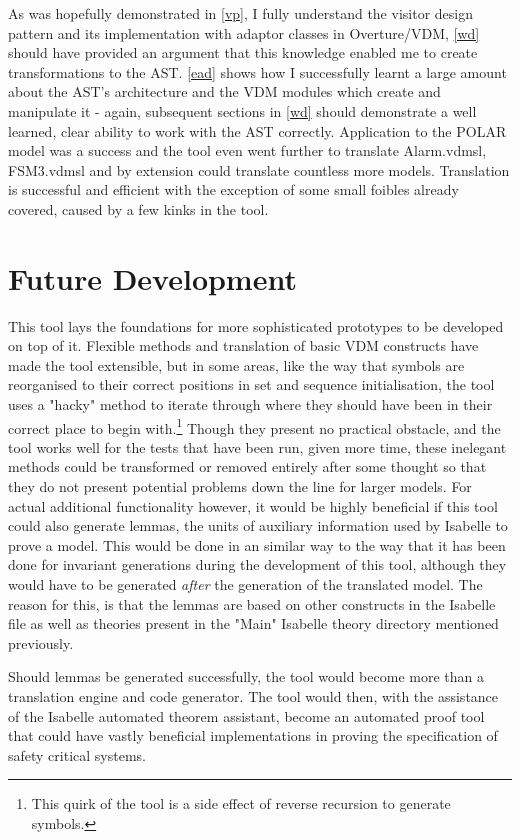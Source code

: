 As was hopefully demonstrated in \ref{vp}, I fully understand the visitor design pattern and its implementation with adaptor classes in Overture/VDM, \ref{wd} should have provided an argument that this knowledge enabled me to create transformations to the AST. \ref{ead} shows how I successfully learnt a large amount about the AST's architecture and the VDM modules which create and manipulate it - again, subsequent sections in \ref{wd} should demonstrate a well learned, clear ability to work with the AST correctly. Application to the POLAR model was a success and the tool even went further to translate Alarm.vdmsl, FSM3.vdmsl and by extension could translate countless more models. Translation is successful and efficient with the exception of some small foibles already covered, caused by a few kinks in the tool.

\section{Future Development}
This tool lays the foundations for more sophisticated prototypes to be developed on top of it. Flexible methods and translation of basic VDM constructs have made the tool extensible, but in some areas, like the way that symbols are reorganised to their correct positions in set and sequence initialisation, the tool uses a "hacky" method to iterate through where they should have been in their correct place to begin with.\footnote{This quirk of the tool is a side effect of reverse recursion to generate symbols.} Though they present no practical obstacle, and the tool works well for the tests that have been run, given more time, these inelegant methods could be transformed or removed entirely after some thought so that they do not present potential problems down the line for larger models. For actual additional functionality however, it would be highly beneficial if this tool could also generate lemmas, the units of auxiliary information used by Isabelle to prove a model. This would be done in an similar way to the way that it has been done for invariant generations during the development of this tool, although they would have to be generated \emph{after} the generation of the translated model. The reason for this, is that the lemmas are based on other constructs in the Isabelle file as well as theories present in the "Main" Isabelle theory directory mentioned previously. 

Should lemmas be generated successfully, the tool would become more than a translation engine and code generator. The tool would then, with the assistance of the Isabelle automated theorem assistant, become an automated proof tool that could have vastly beneficial implementations in proving the specification of safety critical systems.  


